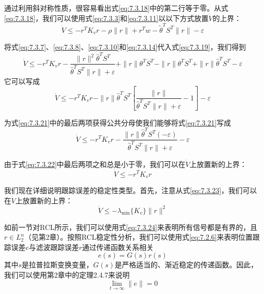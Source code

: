 \documentclass[UTF8]{ctexart}
\begin{document}
通过利用斜对称性质，很容易看出式\eqref{eq:7.3.18}中的第二行等于零。从式\eqref{eq:7.3.18}，我们可以使用式\eqref{eq:7.3.3}和\eqref{eq:7.3.11}以以下方式放置$\dot{V}$的上界：
\begin{equation}\label{eq:7.3.19}
\dot{V} \leq -r^T K_v r - \rho\|r\| + r^T w - \tilde{\theta}^T S^T\|r\| - \varepsilon
\end{equation}

将式\eqref{eq:7.3.7}、\eqref{eq:7.3.8}、\eqref{eq:7.3.10}和\eqref{eq:7.3.14}代入式\eqref{eq:7.3.19}，我们得到
\begin{equation}\label{eq:7.3.20}
\dot{V} \leq -r^T K_v r - \frac{\|r\|^2\hat{\theta}^T S^T}{\hat{\theta}^T S^T\|r\| + \varepsilon} + \|r\|\theta^T S^T - \|r\|\theta^T S^T + \|r\|\hat{\theta}^T S^T - \varepsilon
\end{equation}
它可以写成
\begin{equation}\label{eq:7.3.21}
\dot{V} \leq -r^T K_v r - \|r\|\hat{\theta}^T S^T\left[\frac{\|r\|}{\hat{\theta}^T S^T\|r\| + \varepsilon} - 1\right] - \varepsilon
\end{equation}

为式\eqref{eq:7.3.21}中的最后两项获得公共分母使我们能够将式\eqref{eq:7.3.21}写成
\begin{equation}\label{eq:7.3.22}
\dot{V} \leq -r^T K_v r - \frac{\|r\|\hat{\theta}^T S^T(-\varepsilon)}{\hat{\theta}^T S^T\|r\| + \varepsilon} - \varepsilon
\end{equation}

由于式\eqref{eq:7.3.22}中最后两项之和总是小于零，我们可以在$\dot{V}$上放置新的上界：
\begin{equation}\label{eq:7.3.23}
\dot{V} \leq -r^T K_v r
\end{equation}

我们现在详细说明跟踪误差的稳定性类型。首先，注意从式\eqref{eq:7.3.23}，我们可以在$\dot{V}$上放置新的上界：
\begin{equation}\label{eq:7.3.24}
\dot{V} \leq -\lambda_{\min}\{K_v\}\|r\|^2
\end{equation}

如前一节对RCL所示，我们可以使用式\eqref{eq:7.3.24}来表明所有信号都是有界的，且$r \in L_2^n$（见第2章）。按照RCL稳定性分析，我们可以使用式\eqref{eq:7.2.6}来表明位置跟踪误差$e$与滤波跟踪误差$r$通过传递函数关系相关
\begin{equation}\label{eq:7.3.25}
e(s) = G(s)r(s)
\end{equation}
其中$s$是拉普拉斯变换变量，$G(s)$是严格适当的、渐近稳定的传递函数。因此，我们可以使用第2章中的定理2.4.7来说明
\begin{equation}\label{eq:7.3.26}
\lim_{t \to \infty} \|e\| = 0
\end{equation}
\end{document}
